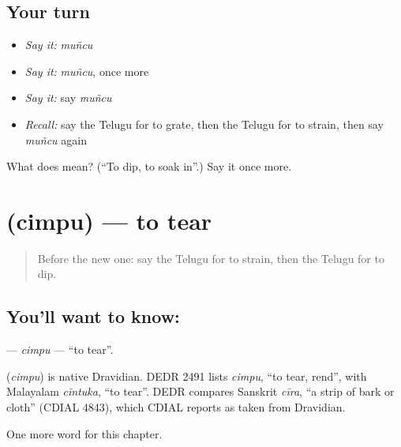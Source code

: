 \subsection*{Your turn}
\begin{itemize}
\raggedright
  \item \emph{Say it:} \emph{muñcu}
  \item \emph{Say it:} \emph{muñcu}, once more
  \item \emph{Say it:} say \emph{muñcu}
  \item \emph{Recall:} say the Telugu for to grate, then the Telugu for to strain, then say \emph{muñcu} again
\end{itemize}

\begin{tcolorbox}[breakable,colback=teal!4,colframe=teal!35!black,title={Before you move on}]
What does  mean? (\textquotedblleft{}To dip, to soak in\textquotedblright{}.) Say it once more.
\end{tcolorbox}
\section[\texorpdfstring{\te{చింపు} (cimpu)}{చింపు (cimpu)}]{ (cimpu) — to tear}

\label{lesson:TE-C164-cimpu}



\begin{quote}
Before the new one: say the Telugu for to strain, then the Telugu for to dip.
\end{quote}

\subsection*{You'll want to know: }
\textbf{} — \emph{cimpu} — \textquotedblleft{}to tear\textquotedblright{}.

\begin{cousinweb}
\textbf{} (\emph{cimpu}) is native Dravidian. DEDR 2491 lists \emph{cimpu}, \textquotedblleft{}to tear, rend\textquotedblright{}, with Malayalam \emph{cīntuka}, \textquotedblleft{}to tear\textquotedblright{}. DEDR compares Sanskrit \emph{cīra}, \textquotedblleft{}a strip of bark or cloth\textquotedblright{} (CDIAL 4843), which CDIAL reports as taken from Dravidian.
\end{cousinweb}

\begin{grammarlens}[title={What you've built}]
One more word for this chapter.
\end{grammarlens}

